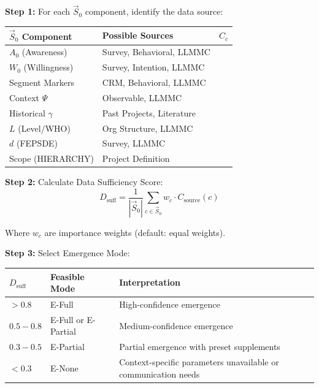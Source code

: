\begin{tcolorbox}[colback=green!5!white, colframe=green!75!black,
    title=\textbf{Protocol IE-P1: Data Sufficiency Score}]

\textbf{Step 1:} For each $\vec{S}_0$ component, identify the data source:

\begin{center}
\footnotesize
\renewcommand{\arraystretch}{1.2}
\begin{tabular}{@{}llc@{}}
\toprule
\textbf{$\vec{S}_0$ Component} & \textbf{Possible Sources} & \textbf{$C_c$} \\
\midrule
$A_0$ (Awareness) & Survey, Behavioral, LLMMC & \\
$W_0$ (Willingness) & Survey, Intention, LLMMC & \\
Segment Markers & CRM, Behavioral, LLMMC & \\
Context $\Psi$ & Observable, LLMMC & \\
Historical $\gamma$ & Past Projects, Literature & \\
$L$ (Level/WHO) & Org Structure, LLMMC & \\
$d$ (FEPSDE) & Survey, LLMMC & \\
Scope (HIERARCHY) & Project Definition & \\
\bottomrule
\end{tabular}
\end{center}

\textbf{Step 2:} Calculate Data Sufficiency Score:
\begin{equation}
\boxed{D_{\text{suff}} = \frac{1}{|\vec{S}_0|} \sum_{c \in \vec{S}_0} w_c \cdot C_{\text{source}}(c)}
\label{eq:ie-data-sufficiency}
\end{equation}

Where $w_c$ are importance weights (default: equal weights).

\textbf{Step 3:} Select Emergence Mode:
\begin{center}
\renewcommand{\arraystretch}{1.2}
\begin{tabular}{@{}lll@{}}
\toprule
\textbf{$D_{\text{suff}}$} & \textbf{Feasible Mode} & \textbf{Interpretation} \\
\midrule
$> 0.8$ & E-Full & High-confidence emergence \\
$0.5 - 0.8$ & E-Full or E-Partial & Medium-confidence emergence \\
$0.3 - 0.5$ & E-Partial & Partial emergence with preset supplements \\
$< 0.3$ & E-None & Context-specific parameters unavailable or communication needs \\
\bottomrule
\end{tabular}
\end{center}
\end{tcolorbox}


